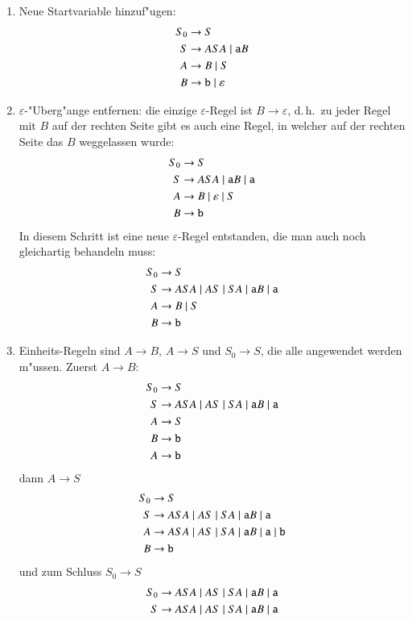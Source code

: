 \begin{enumerate}
\item Neue Startvariable hinzuf"ugen:
\begin{align*}
S_0&\to S\\
S&\to ASA\;|\; {\tt a}B\\
A&\to B\;|\; S\\
B&\to{\tt b}\;|\; \varepsilon
\end{align*}
\item $\varepsilon$-"Uberg"ange entfernen: die einzige $\varepsilon$-Regel
ist $B\to\varepsilon$, d.\,h.~zu jeder Regel mit $B$ auf der rechten
Seite gibt es auch eine Regel, in welcher auf der rechten Seite das $B$
weggelassen wurde:
\begin{align*}
S_0&\to S\\
S&\to ASA\;|\; {\tt a}B\;|\;{\tt a}\\
A&\to B \;|\; \varepsilon \;|\; S\\
B&\to{\tt b}
\end{align*}
In diesem Schritt ist eine neue $\varepsilon$-Regel entstanden, die
man auch noch gleichartig behandeln muss:
\begin{align*}
S_0&\to S\\
S&\to ASA \;|\; AS \;|\; SA \;|\; {\tt a}B\;|\;{\tt a}\\
A&\to B \;|\; S\\
B&\to{\tt b}
\end{align*}
\item Einheits-Regeln sind $A\to B$, $A\to S$ und $S_0\to S$,
die alle angewendet werden
m"ussen. Zuerst $A\to B$:
\begin{align*}
S_0&\to S\\
S&\to ASA \;|\; AS \;|\; SA \;|\; {\tt a}B\;|\;{\tt a}\\
A&\to S\\
B&\to{\tt b}\\
A&\to{\tt b}
\end{align*}
dann $A\to S$
\begin{align*}
S_0&\to S\\
S&\to ASA \;|\; AS \;|\; SA \;|\; {\tt a}B\;|\;{\tt a}\\
A&\to ASA \;|\; AS \;|\; SA \;|\; {\tt a}B\;|\;{\tt a}\;|\;{\tt b}\\
B&\to{\tt b}
\end{align*}
und zum Schluss $S_0\to S$
\begin{align*}
S_0&\to ASA \;|\; AS \;|\; SA \;|\; {\tt a}B\;|\;{\tt a}\\
S&\to ASA \;|\; AS \;|\; SA \;|\; {\tt a}B\;|\;{\tt a}\\

\end{align*}
\end{enumerate}
